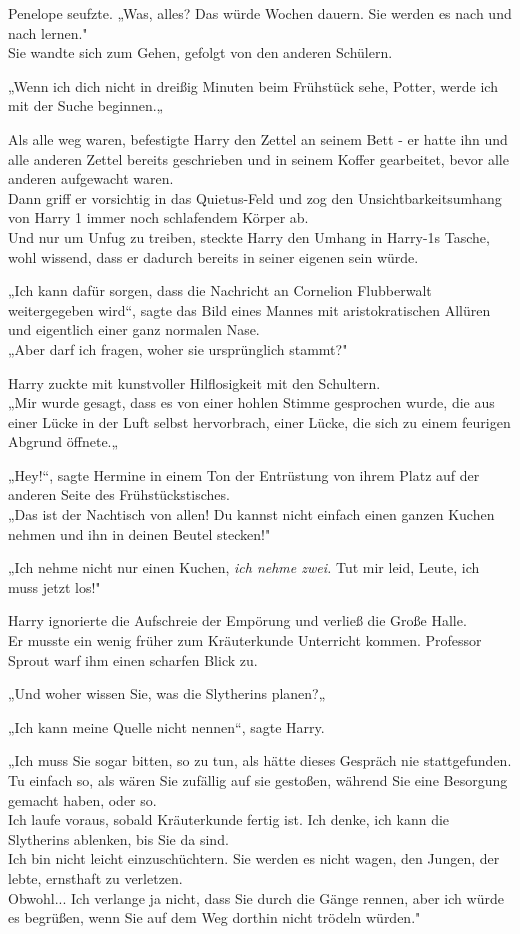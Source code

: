 {Penelope seufzte. „Was, alles? Das würde Wochen dauern. Sie werden es nach und nach lernen."\\ Sie wandte sich zum Gehen, gefolgt von den anderen Schülern.

„Wenn ich dich nicht in dreißig Minuten beim Frühstück sehe, Potter, werde ich mit der Suche beginnen.„

Als alle weg waren, befestigte Harry den Zettel an seinem Bett - er hatte ihn und alle anderen Zettel bereits geschrieben und in seinem Koffer gearbeitet, bevor alle anderen aufgewacht waren.\\ Dann griff er vorsichtig in das Quietus-Feld und zog den Unsichtbarkeitsumhang von Harry 1 immer noch schlafendem Körper ab.\\ Und nur um Unfug zu treiben, steckte Harry den Umhang in Harry-1s Tasche, wohl wissend, dass er dadurch bereits in seiner eigenen sein würde.

„Ich kann dafür sorgen, dass die Nachricht an Cornelion Flubberwalt weitergegeben wird“, sagte das Bild eines Mannes mit aristokratischen Allüren und eigentlich einer ganz normalen Nase.\\ „Aber darf ich fragen, woher sie ursprünglich stammt?"

Harry zuckte mit kunstvoller Hilflosigkeit mit den Schultern.\\ „Mir wurde gesagt, dass es von einer hohlen Stimme gesprochen wurde, die aus einer Lücke in der Luft selbst hervorbrach, einer Lücke, die sich zu einem feurigen Abgrund öffnete.„

„Hey!“, sagte Hermine in einem Ton der Entrüstung von ihrem Platz auf der anderen Seite des Frühstückstisches.\\ „Das ist der Nachtisch von allen! Du kannst nicht einfach einen ganzen Kuchen nehmen und ihn in deinen Beutel stecken!"

„Ich nehme nicht nur einen Kuchen, \emph{ich nehme zwei.} Tut mir leid, Leute, ich muss jetzt los!"

Harry ignorierte die Aufschreie der Empörung und verließ die Große Halle.\\ Er musste ein wenig früher zum Kräuterkunde Unterricht kommen. Professor Sprout warf ihm einen scharfen Blick zu.

„Und woher wissen Sie, was die Slytherins planen?„

„Ich kann meine Quelle nicht nennen“, sagte Harry.

„Ich muss Sie sogar bitten, so zu tun, als hätte dieses Gespräch nie stattgefunden. Tu einfach so, als wären Sie zufällig auf sie gestoßen, während Sie eine Besorgung gemacht haben, oder so.\\ Ich laufe voraus, sobald Kräuterkunde fertig ist. Ich denke, ich kann die Slytherins ablenken, bis Sie da sind.\\ Ich bin nicht leicht einzuschüchtern. Sie werden es nicht wagen, den Jungen, der lebte, ernsthaft zu verletzen.\\ Obwohl... Ich verlange ja nicht, dass Sie durch die Gänge rennen, aber ich würde es begrüßen, wenn Sie auf dem Weg dorthin nicht trödeln würden."

}
